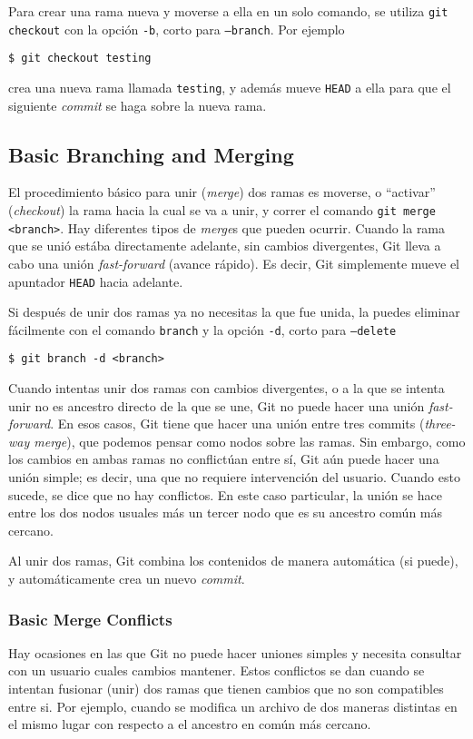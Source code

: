 \documentclass[spanish, 12pt, a4paper]{article}
\begin{document}
Para crear una rama nueva y moverse a ella en un solo comando, se utiliza
\texttt{git checkout} con la opción \texttt{-b}, corto para \texttt{--branch}.
Por ejemplo
\begin{lstlisting}
$ git checkout testing
\end{lstlisting}
crea una nueva rama llamada \texttt{testing}, y además mueve \texttt{HEAD} a
ella para que el siguiente \textit{commit} se haga sobre la nueva rama.

\subsection{Basic Branching and Merging}
El procedimiento básico para unir (\textit{merge}) dos ramas es moverse, o
``activar'' (\textit{checkout}) la rama hacia la cual se va a unir, y correr el
comando \texttt{git merge <branch>}.
Hay diferentes tipos de \textit{merge}s que pueden ocurrir.
Cuando la rama que se unió estába directamente adelante, sin cambios
divergentes, Git lleva a cabo una unión \textit{fast-forward} (avance rápido).
Es decir, Git simplemente mueve el apuntador \texttt{HEAD} hacia adelante.

Si después de unir dos ramas ya no necesitas la que fue unida, la puedes
eliminar fácilmente con el comando \texttt{branch} y la opción \texttt{-d},
corto para \texttt{--delete}
\begin{lstlisting}
$ git branch -d <branch>
\end{lstlisting}

Cuando intentas unir dos ramas con cambios divergentes, o a la que se intenta
unir no es ancestro directo de la que se une, Git no puede hacer una unión
\textit{fast-forward}.
En esos casos, Git tiene que hacer una unión entre tres commits
(\textit{three-way merge}), que podemos pensar como nodos sobre las ramas.
Sin embargo, como los cambios en ambas ramas no conflictúan entre sí, Git aún
puede hacer una unión simple; es decir, una que no requiere intervención del
usuario.
Cuando esto sucede, se dice que no hay conflictos.
En este caso particular, la unión se hace entre los dos nodos usuales más un
tercer nodo que es su ancestro común más cercano.

Al unir dos ramas, Git combina los contenidos de manera automática (si puede), y
automáticamente crea un nuevo \textit{commit}.

\subsubsection{Basic Merge Conflicts}
Hay ocasiones en las que Git no puede hacer uniones simples y necesita consultar
con un usuario cuales cambios mantener.
Estos conflictos se dan cuando se intentan fusionar (unir) dos ramas que tienen
cambios que no son compatibles entre si.
Por ejemplo, cuando se modifica un archivo de dos maneras distintas en el mismo
lugar con respecto a el ancestro en común más cercano.
\end{document}
